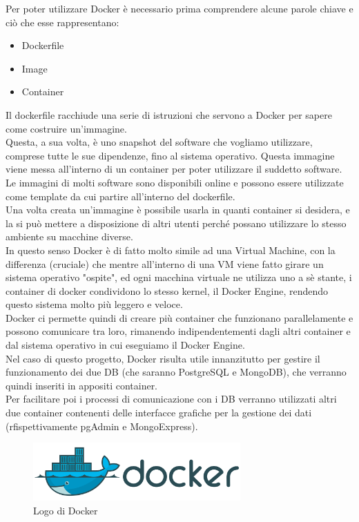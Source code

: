\noindent Per poter utilizzare Docker è necessario prima comprendere alcune parole chiave e ciò che esse rappresentano:
\begin{itemize}
    \item Dockerfile
    \item Image
    \item Container
\end{itemize}
Il dockerfile racchiude una serie di istruzioni che servono a Docker per sapere come costruire un'immagine.\\
Questa, a sua volta, è uno snapshot del software che vogliamo utilizzare, comprese tutte le sue dipendenze, fino al sistema operativo. Questa immagine viene messa all'interno di un container per poter utilizzare il suddetto software.\\
Le immagini di molti software sono disponibili online e possono essere utilizzate come template da cui partire all'interno del dockerfile.\\
Una volta creata un'immagine è possibile usarla in quanti container si desidera, e la si può mettere a disposizione di altri utenti perché possano utilizzare lo stesso ambiente su macchine diverse.\\
In questo senso Docker è di fatto molto simile ad una Virtual Machine, con la differenza (cruciale) che mentre all'interno di una VM viene fatto girare un sistema operativo "ospite", ed ogni macchina virtuale ne utilizza uno a sè stante, i container di docker condividono lo stesso kernel, il Docker Engine, rendendo questo sistema molto più leggero e veloce.\\
Docker ci permette quindi di creare più container che funzionano parallelamente e possono comunicare tra loro, rimanendo indipendentementi dagli altri container e dal sistema operativo in cui eseguiamo il Docker Engine.\\

\noindent Nel caso di questo progetto, Docker risulta utile innanzitutto per gestire il funzionamento dei due DB (che saranno PostgreSQL e MongoDB), che verranno quindi inseriti in appositi container.\\
Per facilitare poi i processi di comunicazione con i DB verranno utilizzati altri due container contenenti delle interfacce grafiche per la gestione dei dati (rfispettivamente pgAdmin e MongoExpress).

\begin{figure}[htbp]
\begin{center}
\includegraphics[height=6em]{immagini/tecnologies-logos/Docker-Logo.png}
\caption{Logo di Docker}
\end{center}
\end{figure}

